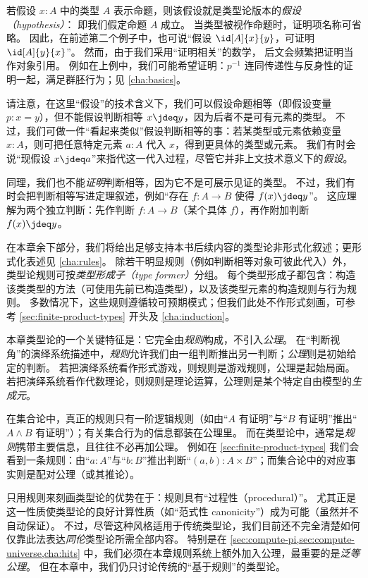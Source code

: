 若假设 $x:A$ 中的类型 $A$ 表示命题，则该假设就是类型论版本的\emph{假设（hypothesis）}：
%
即我们假定命题 $A$ 成立。
当类型被视作命题时，证明项名称可省略。
因此，在前述第二个例子中，也可说“假设 $\id[A]{x}{y}$，可证明 $\id[A]{y}{x}$”。
然而，由于我们采用“证明相关”的数学，
%
后文会频繁把证明当作对象引用。
例如在上例中，我们可能希望证明：$p^{-1}$ 连同传递性与反身性的证明一起，满足群胚行为；见 \cref{cha:basics}。

请注意，在这里“假设”的技术含义下，我们可以假设命题相等（即假设变量 $p:x=y$），但不能假设判断相等 $x\jdeq y$，因为后者不是可有元素的类型。
不过，我们可做一件“看起来类似”假设判断相等的事：若某类型或元素依赖变量 $x:A$，则可把任意特定元素 $a:A$ 代入 $x$，得到更具体的类型或元素。
我们有时会说“现假设 $x\jdeq a$”来指代这一代入过程，尽管它并非上文技术意义下的\emph{假设}。
%

同理，我们也不能\emph{证明}判断相等，因为它不是可展示见证的类型。
不过，我们有时会把判断相等写进定理叙述，例如“存在 $f:A\to B$ 使得 $f(x)\jdeq y$”。
这应理解为两个独立判断：先作判断 $f:A\to B$（某个具体 $f$），再作附加判断 $f(x)\jdeq y$。

在本章余下部分，我们将给出足够支持本书后续内容的类型论非形式化叙述；更形式化表述见 \cref{cha:rules}。
除若干明显规则（例如判断相等对象可彼此代入）外，类型论规则可按\emph{类型形成子（type former）}分组。
每个类型形成子都包含：构造该类类型的方法（可使用先前已构造类型），以及该类型元素的构造规则与行为规则。
多数情况下，这些规则遵循较可预期模式；但我们此处不作形式刻画，可参考 \cref{sec:finite-product-types} 开头及 \cref{cha:induction}。


%
%
本章类型论的一个关键特征是：它完全由\emph{规则}构成，不引入\emph{公理}。
在“判断视角”的演绎系统描述中，\emph{规则}允许我们由一组判断推出另一判断；\emph{公理}则是初始给定的判断。
若把演绎系统看作形式游戏，则规则是游戏规则，公理是起始局面。
若把演绎系统看作代数理论，则规则是理论运算，公理则是某个特定自由模型的\emph{生成元}。

在集合论中，真正的规则只有一阶逻辑规则（如由“$A$ 有证明”与“$B$ 有证明”推出“$A\wedge B$ 有证明”）；有关集合行为的信息都装在公理里。
而在类型论中，通常是\emph{规则}携带主要信息，且往往不必再加公理。
例如在 \cref{sec:finite-product-types} 我们会看到一条规则：由“$a:A$”与“$b:B$”推出判断“$(a,b):A\times B$”；而集合论中的对应事实则是配对公理（或其推论）。

只用规则来刻画类型论的优势在于：规则具有“过程性（procedural）”。
尤其正是这一性质使类型论的良好计算性质（如“范式性 canonicity”）成为可能（虽然并不自动保证）。
不过，尽管这种风格适用于传统类型论，我们目前还不完全清楚如何仅靠此法表达\emph{同伦}类型论所需全部内容。
特别是在 \cref{sec:compute-pi,sec:compute-universe,cha:hits} 中，我们必须在本章规则系统上额外加入公理，最重要的是\emph{泛等公理}。
但在本章中，我们仍只讨论传统的“基于规则”的类型论。



